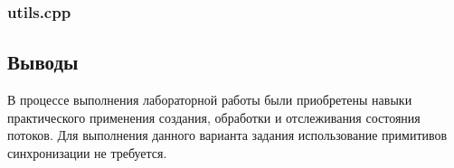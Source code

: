 \documentclass[12pt]{article}
\begin{document}
	
	
	\subsubsection*{utils.cpp}
	
	
		
	\subsection*{Выводы}
	
	В процессе выполнения лабораторной работы были приобретены навыки практического применения создания, обработки и отслеживания состояния потоков. Для выполнения данного варианта задания использование примитивов синхронизации не требуется.
	
\end{document}
